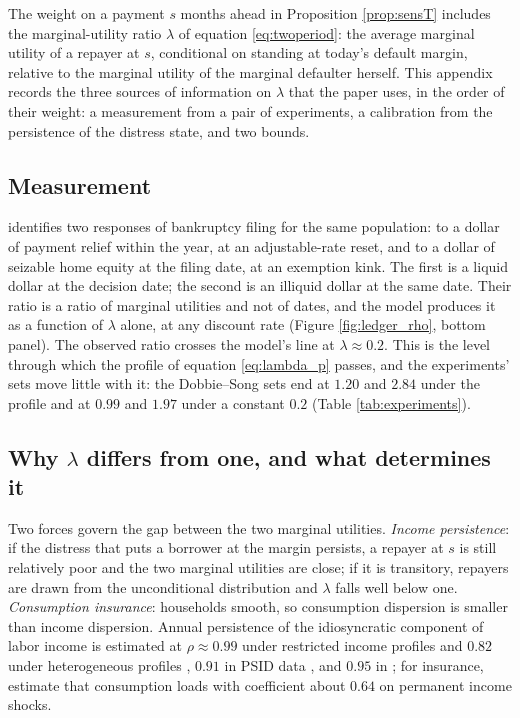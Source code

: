 \documentclass[12pt,english]{article}
\begin{document}
The weight on a payment $s$ months ahead in Proposition \ref{prop:sensT} includes the marginal-utility ratio $\lambda$ of equation \eqref{eq:twoperiod}: the average marginal utility of a repayer at $s$, conditional on standing at today's default margin, relative to the marginal utility of the marginal defaulter herself. This appendix records the three sources of information on $\lambda$ that the paper uses, in the order of their weight: a measurement from a pair of experiments, a calibration from the persistence of the distress state, and two bounds.

\subsection{Measurement}

\citet{indarte_moral_2023} identifies two responses of bankruptcy filing for the same population: to a dollar of payment relief within the year, at an adjustable-rate reset, and to a dollar of seizable home equity at the filing date, at an exemption kink. The first is a liquid dollar at the decision date; the second is an illiquid dollar at the same date. Their ratio is a ratio of marginal utilities and not of dates, and the model produces it as a function of $\lambda$ alone, at any discount rate (Figure \ref{fig:ledger_rho}, bottom panel). The observed ratio crosses the model's line at $\lambda \approx 0.2$. This is the level through which the profile of equation \eqref{eq:lambda_p} passes, and the experiments' sets move little with it: the Dobbie--Song sets end at $1.20$ and $2.84$ under the profile and at $0.99$ and $1.97$ under a constant $0.2$ (Table \ref{tab:experiments}).

\subsection{Why $\lambda$ differs from one, and what determines it}\label{appendix:measuredrho}

Two forces govern the gap between the two marginal utilities. \emph{Income persistence}: if the distress that puts a borrower at the margin persists, a repayer at $s$ is still relatively poor and the two marginal utilities are close; if it is transitory, repayers are drawn from the unconditional distribution and $\lambda$ falls well below one. \emph{Consumption insurance}: households smooth, so consumption dispersion is smaller than income dispersion. Annual persistence of the idiosyncratic component of labor income is estimated at $\rho \approx 0.99$ under restricted income profiles and $0.82$ under heterogeneous profiles \citep{guvenen_empirical_2009}, $0.91$ in PSID data \citep{floden_idiosyncratic_2001}, and $0.95$ in \citet{storesletten_cyclical_2004}; for insurance, \citet{blundell_consumption_2008} estimate that consumption loads with coefficient about $0.64$ on permanent income shocks.
\end{document}
